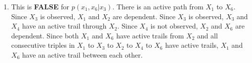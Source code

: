 \documentclass[english]{article}
\begin{document}
\begin{enumerate}
\begin{enumerate}
    \item This is \textbf{FALSE} for $p(x_1, x_6 | x_3)$. There is an active path from $X_1$ to $X_6$. Since $X_3$ is observed, $X_1$ and $X_2$ are dependent. Since $X_3$ is observed, $X_3$ and $X_4$ have an active trail through $X_2$. Since $X_4$ is not observed, $X_2$ and $X_6$ are dependent. Since both $X_1$ and $X_6$ have active trails from $X_2$ and all consecutive triples in $X_1$ to $X_3$ to $X_2$ to $X_4$ to $X_6$ have active trails, $X_1$ and $X_6$ have an active trail between each other.
    \end{enumerate}
\end{enumerate} 

\newpage
\end{document}

